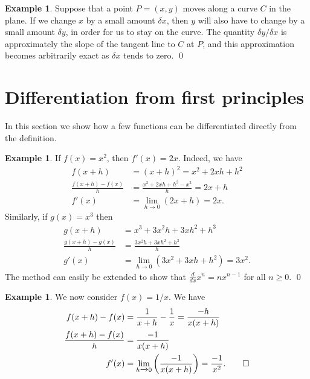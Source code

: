 \documentclass[a4paper]{book}
\newcommand{\dl}        {\delta}
\newcommand{\xra}       {\xrightarrow}
\renewcommand{\:}{\colon}
\theoremstyle{definition}
\newtheorem{example}[theorem]{Example}
\begin{document}
\begin{example}
 Suppose that a point $P=(x,y)$ moves along a curve $C$ in the plane.
 If we change $x$ by a small amount $\dl x$, then $y$ will also have
 to change by a small amount $\dl y$, in order for us to stay on the
 curve.  The quantity $\dl y/\dl x$ is approximately the slope of the
 tangent line to $C$ at $P$, and this approximation becomes
 arbitrarily exact as $\dl x$ tends to zero. \qed
\end{example}

\section{Differentiation from first principles}
\label{sec-diff-limit}

In this section we show how a few functions can be differentiated
directly from the definition.

\begin{example}
 If $f(x)=x^2$, then $f'(x)=2x$.  Indeed, we have
 \begin{align*}
  f(x+h) &= (x+h)^2 = x^2 + 2xh + h^2 \\
  \frac{f(x+h)-f(x)}{h}
   &= \frac{x^2+2xh+h^2-x^2}{h} = 2x + h \\
  f'(x) &= \lim_{h\xra{}0}(2x+h) = 2x.
 \end{align*}
 Similarly, if $g(x)=x^3$ then
 \begin{align*}
  g(x+h) &= x^3 + 3x^2h + 3xh^2 + h^3 \\
  \frac{g(x+h)-g(x)}{h}
   &= \frac{3x^2h+3xh^2+h^3}{h} \\
  g'(x) &= \lim_{h\xra{}0}(3x^2 + 3xh + h^2) = 3x^2.
 \end{align*}
 The method can easily be extended to show that
 $\frac{d}{dx}x^n=nx^{n-1}$ for all $n\geq 0$. \qed
\end{example}

\begin{example}
 We now consider $f(x)=1/x$.  We have
 \begin{align*}
  f(x+h) - f(x) &= \frac{1}{x+h} - \frac{1}{x} = \frac{-h}{x(x+h)} \\
  \frac{f(x+h)-f(x)}{h} &= \frac{-1}{x(x+h)} \\
  f'(x) &= \lim_{h\xra{}0} \left(\frac{-1}{x(x+h)}\right) 
         = \frac{-1}{x^2}. \qed
 \end{align*}
\end{example}
\end{document}
